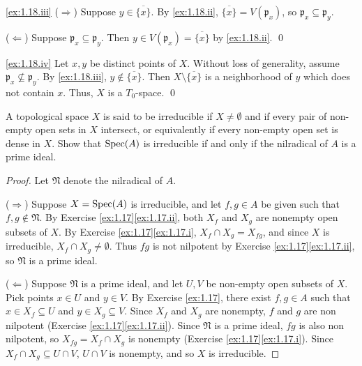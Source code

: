 \noindent
\ref{ex:1.18.iii}
($\Rightarrow$)
Suppose $y \in \overline{\{x\}}$.
By \ref{ex:1.18.ii}, $\overline{\{x\}} = V(\mathfrak p_x)$, so $\mathfrak p_x \subseteq \mathfrak p_y$.

($\Leftarrow$)
Suppose $\mathfrak p_x \subseteq \mathfrak p_y$.
Then $y \in V(\mathfrak p_x) = \overline{\{x\}}$ by \ref{ex:1.18.ii}.
\qed

\noindent
\ref{ex:1.18.iv}
Let $x,y$ be distinct points of $X$.
Without loss of generality, assume $\mathfrak p_x \not\subseteq \mathfrak p_y$.
By \ref{ex:1.18.iii}, $y \notin \overline{\{x\}}$.
Then $X\setminus\overline{\{x\}}$ is a neighborhood of $y$ which does not contain $x$.
Thus, $X$ is a $T_0$-space.
\qed







\begin{exercise}
\label{ex:1.19}
A topological space $X$ is said to be irreducible if $X \neq \emptyset$ and if every pair of non-empty open sets in $X$ intersect, or equivalently if every non-empty open set is dense in $X$.
Show that $\operatorname{Spec}(A)$ is irreducible if and only if the nilradical of $A$ is a prime ideal.
\end{exercise}

\begin{proof}
Let $\mathfrak N$ denote the nilradical of $A$.

($\Rightarrow$)
Suppose $X=\operatorname{Spec}(A)$ is irreducible, and let $f,g\in A$ be given such that $f, g \notin \mathfrak N$.
By Exercise \ref{ex:1.17}\ref{ex:1.17.ii}, both $X_f$ and $X_g$ are nonempty open subsets of $X$.
By Exercise \ref{ex:1.17}\ref{ex:1.17.i}, $X_f \cap X_g = X_{f g}$, and since $X$ is irreducible, $X_f \cap X_g \neq \emptyset$.
Thus $f g$ is not nilpotent by Exercise \ref{ex:1.17}\ref{ex:1.17.ii}, so $\mathfrak N$ is a prime ideal.

($\Leftarrow$)
Suppose $\mathfrak N$ is a prime ideal, and let $U,V$ be non-empty open subsets of $X$.
Pick points $x\in U$ and $y \in V$.
By Exercise \ref{ex:1.17}, there exist $f,g\in A$ such that $x \in X_f \subseteq U$ and $y \in X_g \subseteq V$.
Since $X_f$ and $X_g$ are nonempty, $f$ and $g$ are non nilpotent (Exercise \ref{ex:1.17}\ref{ex:1.17.ii}).
Since $\mathfrak N$ is a prime ideal, $f g$ is also non nilpotent, so $X_{f g} = X_f \cap X_g$ is nonempty (Exercise \ref{ex:1.17}\ref{ex:1.17.i}).
Since $X_f \cap X_g \subseteq U \cap V$, $U \cap V$ is nonempty, and so $X$ is irreducible.
\end{proof}







